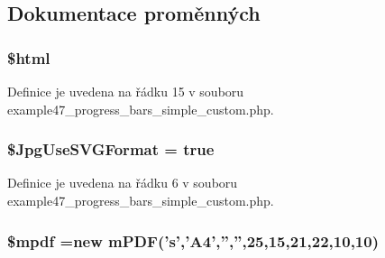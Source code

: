 \subsection{Dokumentace proměnných}
\hypertarget{example47__progress__bars__simple__custom_8php_a6f96e7fc92441776c9d1cd3386663b40}{
\subsubsection[{\$html}]{\setlength{\rightskip}{0pt plus 5cm}\$html}}\label{example47__progress__bars__simple__custom_8php_a6f96e7fc92441776c9d1cd3386663b40}


Definice je uvedena na řádku 15 v souboru example47\-\_\-progress\-\_\-bars\-\_\-simple\-\_\-custom.\-php.

\hypertarget{example47__progress__bars__simple__custom_8php_a4767d5ef05aa1f95f7a64c0aa8f26ccc}{
\subsubsection[{\$\-Jpg\-Use\-S\-V\-G\-Format}]{\setlength{\rightskip}{0pt plus 5cm}\$Jpg\-Use\-S\-V\-G\-Format = true}}\label{example47__progress__bars__simple__custom_8php_a4767d5ef05aa1f95f7a64c0aa8f26ccc}


Definice je uvedena na řádku 6 v souboru example47\-\_\-progress\-\_\-bars\-\_\-simple\-\_\-custom.\-php.

\hypertarget{example47__progress__bars__simple__custom_8php_ad028f81910d6cbab9b184d2214b3a8f8}{
\subsubsection[{\$mpdf}]{\setlength{\rightskip}{0pt plus 5cm}\$mpdf =new {\bf m\-P\-D\-F}('s','A4','','',25,15,21,22,10,10)}}\label{example47__progress__bars__simple__custom_8php_ad028f81910d6cbab9b184d2214b3a8f8}


